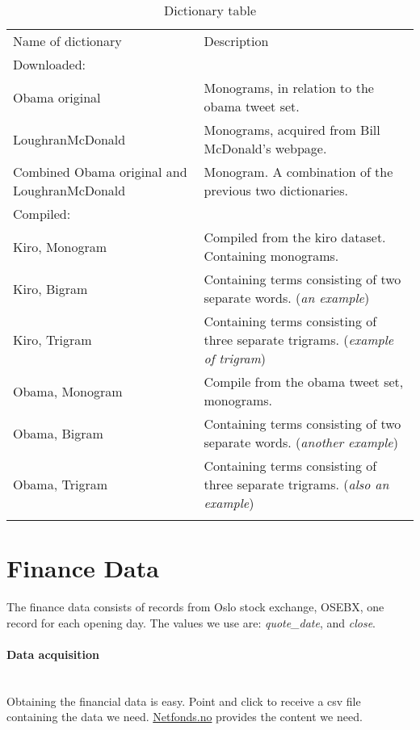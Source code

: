 \begin{table}
\centering
\label{tbl:dictionaries}
\caption{Dictionary table}
\begin{tabular}{ p{5cm} p{7cm} }
Name of dictionary & Description \\
Downloaded:& \\
\hline
Obama original & Monograms, in relation to the obama tweet set. \\
LoughranMcDonald & Monograms, acquired from Bill McDonald's webpage.\\
Combined Obama original and LoughranMcDonald & Monogram. A combination of
the previous two dictionaries. \\

Compiled:& \\
\hline
Kiro, Monogram & Compiled from the kiro dataset. Containing
monograms. \\
Kiro, Bigram &  Containing terms consisting of two separate words. (\textit{an 
example}) \\
Kiro, Trigram & Containing terms consisting of three separate trigrams.
(\textit{example of trigram})\\
Obama, Monogram & Compile from the obama tweet set, monograms. \\
Obama, Bigram & Containing terms consisting of two separate words.
(\textit{another example}) \\
Obama, Trigram & Containing terms consisting of three separate trigrams.
(\textit{also an example})\\

	\label{data:dictionary_list}
\end{tabular}
\end{table}
%

\section{Finance Data}\label{data:finance}
The finance data consists of records from Oslo stock exchange, OSEBX, one
record for each opening day. 
The values we use are: \textit{quote\_date}, and \textit{close}.

\paragraph{Data acquisition}
\hspace{0pt}\\
Obtaining the financial data is easy. Point and click to receive a csv file
containing the data we need. \url{Netfonds.no} provides the content we need.

